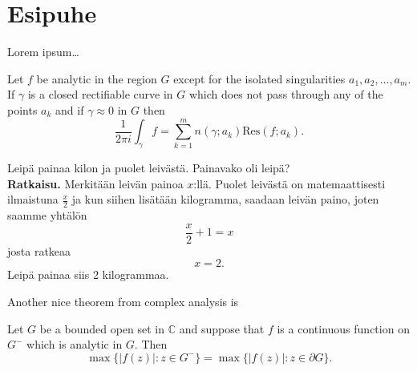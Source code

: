 


\chapter{Esipuhe}



Lorem ipsum\ldots


\begin{theorem}
Let $f$ be analytic in the region $G$ except for the isolated singularities $a_1,a_2,\ldots,a_m$. If $\gamma$ is a closed rectifiable curve in $G$ which does not pass through any of the points $a_k$ and if $\gamma\approx 0$ in $G$ then
\[
\frac{1}{2\pi i}\int_\gamma f = \sum_{k=1}^m n(\gamma;a_k) \text{Res}(f;a_k).
\]
\end{theorem}

\begin{esimerkki}
Leipä painaa kilon ja puolet leivästä. Painavako oli leipä?\\
{\bf Ratkaisu.} Merkitään leivän painoa $x$:llä. Puolet leivästä on matemaattisesti ilmaistuna $\frac{x}{2}$ ja kun siihen lisätään kilogramma, saadaan leivän paino, joten saamme yhtälön
\begin{equation}
\frac{x}{2}+1=x
\end{equation}
josta ratkeaa
\begin{equation}
x=2.
\end{equation}
Leipä painaa siis 2 kilogrammaa.
\end{esimerkki}

Another nice theorem from complex analysis is

\begin{theorem}
Let $G$ be a bounded open set in $\mathbb{C}$ and suppose that $f$ is a continuous function on $G^-$ which is analytic in $G$. Then
\[
\max\{|f(z)|:z\in G^-\}=\max \{|f(z)|:z\in \partial G \}.
\]
\end{theorem}

